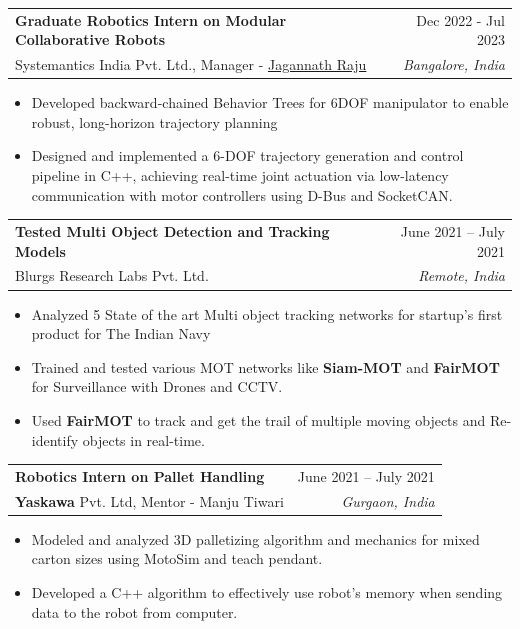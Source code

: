 \documentclass[letterpaper, 11pt]{article}
\makeatletter
\newcommand{\resumeItem}[1]{ \item\small{ {#1 \vspace{-2pt}} } }
\newcommand{\resumeSubheading}[4]{
\vspace{-1pt}
\item
\begin{tabular*}{1.0\textwidth}[t]{l@{\extracolsep{\fill}}r}
	\textbf{#1}       & {\small #2} \\
	{\small#3} & \textit{\small #4} \\
\end{tabular*}
\vspace{-10pt}
}
\newcommand{\resumeItemListStart}{\begin{itemize}[leftmargin=0.25in]}
\newcommand{\resumeItemListEnd}{\end{itemize}
\vspace{-5pt}}
\makeatother
\begin{document}
    \resumeSubheading{Graduate Robotics Intern on Modular Collaborative Robots}{Dec 2022 - Jul 2023}{Systemantics India Pvt. Ltd., Manager - \href{https://www.linkedin.com/in/jagannathraju/}{{Jagannath Raju}}}{Bangalore, India}
    \resumeItemListStart 
        \resumeItem{Developed backward-chained Behavior Trees for 6DOF manipulator to enable robust, long-horizon trajectory planning}
        \resumeItem{Designed and implemented a 6-DOF trajectory generation and control pipeline in C++, achieving real-time joint actuation via low-latency communication with motor controllers using D-Bus and SocketCAN.}
    \resumeItemListEnd
    
    \resumeSubheading{Tested Multi Object Detection and Tracking Models}{June 2021 -- July 2021}{Blurgs Research Labs Pvt. Ltd.}{Remote, India} 
    \resumeItemListStart 
        \resumeItem{Analyzed 5 State of the art Multi object tracking networks for startup's first product for The Indian Navy}
        \resumeItem{Trained and tested various MOT networks like \textbf{Siam-MOT} and \textbf{FairMOT} for Surveillance with Drones and CCTV.}
        \resumeItem{Used \textbf{FairMOT} to track and get the trail of multiple moving objects and Re-identify objects in real-time.}
    \resumeItemListEnd

    \resumeSubheading{Robotics Intern on Pallet Handling}{June 2021 -- July 2021}{\textbf{Yaskawa} Pvt. Ltd, Mentor - Manju Tiwari}{Gurgaon, India} 
    \resumeItemListStart 
        \resumeItem{Modeled and analyzed 3D palletizing algorithm and mechanics for mixed carton sizes using MotoSim and teach pendant.}
        \resumeItem{Developed a C++ algorithm to effectively use robot’s memory when sending data to the robot from computer.}
    \resumeItemListEnd
\end{document}
